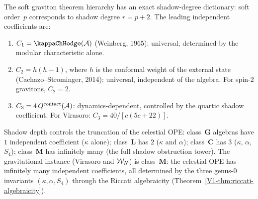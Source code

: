 \begin{remark}
\label{rem:celestial-ope-shadow-degree}
The soft graviton theorem hierarchy has an exact
shadow-degree dictionary: soft order~$p$ corresponds to
shadow degree $r = p + 2$. The leading independent
coefficients are:
\begin{enumerate}[label=\textup{(\roman*)}]
\item $C_1 = \kappaChHodge(\cA)$ (Weinberg, 1965):
 universal, determined by the modular characteristic alone.
\item $C_2 = h(h-1)$, where $h$ is the conformal weight
 of the external state
 (Cachazo--Strominger, 2014):
 universal, independent of the algebra.
 For spin-$2$ gravitons, $C_2 = 2$.
\item $C_3 = 4\,Q^{\mathrm{contact}}(\mathcal{A})$:
 dynamics-dependent, controlled by the quartic shadow
 coefficient. For Virasoro:
 $C_3 = 40/[c(5c{+}22)]$.
\end{enumerate}
Shadow depth controls the truncation of the celestial OPE:
class~$\mathbf{G}$ algebras have $1$ independent coefficient
($\kappa$ alone); class~$\mathbf{L}$ has $2$
($\kappa$ and $\alpha$); class~$\mathbf{C}$ has $3$
($\kappa$, $\alpha$, $S_4$); class~$\mathbf{M}$ has
infinitely many (the full shadow obstruction tower).
The gravitational instance (Virasoro and $\mathcal{W}_N$) is
class~$\mathbf{M}$: the celestial OPE has infinitely
many independent coefficients, all determined by the
three genus-$0$ invariants $(\kappa, \alpha, S_4)$ through
the Riccati algebraicity
(Theorem~\ref*{V1-thm:riccati-algebraicity}).
\end{remark}

